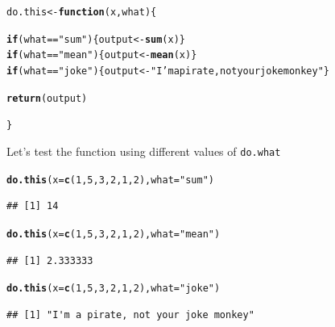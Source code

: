 \documentclass{tufte-book}\usepackage[]{graphicx}\usepackage[]{color}
\makeatletter
\newcommand{\hlnum}[1]{\textcolor[rgb]{0.686,0.059,0.569}{#1}}%
\newcommand{\hlstr}[1]{\textcolor[rgb]{0.192,0.494,0.8}{#1}}%
\newcommand{\hlopt}[1]{\textcolor[rgb]{0,0,0}{#1}}%
\newcommand{\hlstd}[1]{\textcolor[rgb]{0.345,0.345,0.345}{#1}}%
\newcommand{\hlkwa}[1]{\textcolor[rgb]{0.161,0.373,0.58}{\textbf{#1}}}%
\newcommand{\hlkwb}[1]{\textcolor[rgb]{0.69,0.353,0.396}{#1}}%
\newcommand{\hlkwc}[1]{\textcolor[rgb]{0.333,0.667,0.333}{#1}}%
\newcommand{\hlkwd}[1]{\textcolor[rgb]{0.737,0.353,0.396}{\textbf{#1}}}%
\newenvironment{kframe}{%
 \def\at@end@of@kframe{}%
 \ifinner\ifhmode%
  \def\at@end@of@kframe{\end{minipage}}%
  \begin{minipage}{\columnwidth}%
 \fi\fi%
 \def\FrameCommand##1{\hskip\@totalleftmargin \hskip-\fboxsep
 \colorbox{shadecolor}{##1}\hskip-\fboxsep
     \hskip-\linewidth \hskip-\@totalleftmargin \hskip\columnwidth}%
 \MakeFramed {\advance\hsize-\width
   \@totalleftmargin\z@ \linewidth\hsize
   \@setminipage}}%
 {\par\unskip\endMakeFramed%
 \at@end@of@kframe}
\newenvironment{knitrout}{}{} %
\makeatother
\begin{document}
\begin{footnotesize}
\begin{knitrout}
\color{fgcolor}\begin{kframe}
\begin{alltt}
\hlstd{do.this} \hlkwb{<-} \hlkwa{function}\hlstd{(}\hlkwc{x}\hlstd{,} \hlkwc{what}\hlstd{) \{}

  \hlkwa{if} \hlstd{(what} \hlopt{==} \hlstr{"sum"}\hlstd{) \{output} \hlkwb{<-} \hlkwd{sum}\hlstd{(x)\}}
  \hlkwa{if} \hlstd{(what} \hlopt{==} \hlstr{"mean"}\hlstd{) \{output} \hlkwb{<-} \hlkwd{mean}\hlstd{(x)\}}
  \hlkwa{if} \hlstd{(what} \hlopt{==} \hlstr{"joke"}\hlstd{) \{output} \hlkwb{<-} \hlstr{"I'm a pirate, not your joke monkey"}\hlstd{\}}

  \hlkwd{return}\hlstd{(output)}

\hlstd{\}}
\end{alltt}
\end{kframe}
\end{knitrout}

Let's test the function using different values of \texttt{do.what}

\begin{knitrout}
\color{fgcolor}\begin{kframe}
\begin{alltt}
\hlkwd{do.this}\hlstd{(}\hlkwc{x} \hlstd{=} \hlkwd{c}\hlstd{(}\hlnum{1}\hlstd{,} \hlnum{5}\hlstd{,} \hlnum{3}\hlstd{,} \hlnum{2}\hlstd{,} \hlnum{1}\hlstd{,} \hlnum{2}\hlstd{),} \hlkwc{what} \hlstd{=} \hlstr{"sum"}\hlstd{)}
\end{alltt}
\begin{verbatim}
## [1] 14
\end{verbatim}
\begin{alltt}
\hlkwd{do.this}\hlstd{(}\hlkwc{x} \hlstd{=} \hlkwd{c}\hlstd{(}\hlnum{1}\hlstd{,} \hlnum{5}\hlstd{,} \hlnum{3}\hlstd{,} \hlnum{2}\hlstd{,} \hlnum{1}\hlstd{,} \hlnum{2}\hlstd{),} \hlkwc{what} \hlstd{=} \hlstr{"mean"}\hlstd{)}
\end{alltt}
\begin{verbatim}
## [1] 2.333333
\end{verbatim}
\begin{alltt}
\hlkwd{do.this}\hlstd{(}\hlkwc{x} \hlstd{=} \hlkwd{c}\hlstd{(}\hlnum{1}\hlstd{,} \hlnum{5}\hlstd{,} \hlnum{3}\hlstd{,} \hlnum{2}\hlstd{,} \hlnum{1}\hlstd{,} \hlnum{2}\hlstd{),} \hlkwc{what} \hlstd{=} \hlstr{"joke"}\hlstd{)}
\end{alltt}
\begin{verbatim}
## [1] "I'm a pirate, not your joke monkey"
\end{verbatim}
\end{kframe}
\end{knitrout}


\end{footnotesize}
\end{document}
